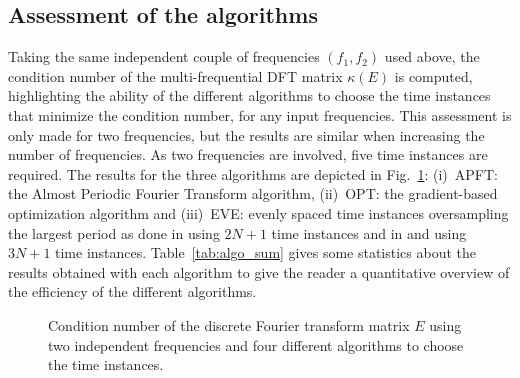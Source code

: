 \subsection{Assessment of the algorithms}
Taking the same independent couple of frequencies $(f_1, f_2)$
used above, the condition number of the
multi-frequential DFT matrix $\kappa (E)$ is computed, highlighting
the ability of the different algorithms to choose the time instances that
minimize the condition number, for any input frequencies. This
assessment is only made for two frequencies, but the results are similar
when increasing the number of frequencies. As two frequencies are
involved, five time instances are required. The results for the three
algorithms are depicted in Fig.~\ref{fig:bench_algo}: (i)~APFT: the
Almost Periodic Fourier Transform algorithm, (ii)~OPT: the
gradient-based optimization algorithm and (iii)~EVE: evenly spaced
time instances oversampling the largest period as done in
\citet{Gopinath2007} using $2N+1$ time
instances and in \citet{Ekici2007} and \citet{Ekici2008} using $3N+1$
time instances.
Table~\ref{tab:algo_sum} gives some statistics about the results obtained
with each algorithm to give the reader a quantitative overview of the
efficiency of the different algorithms.
\begin{figure}[htb]
  \centering 
  \caption{Condition number of the discrete Fourier transform matrix $E$
  using two independent frequencies and four different algorithms
  to choose the time instances.}
  \label{fig:bench_algo}
\end{figure}

